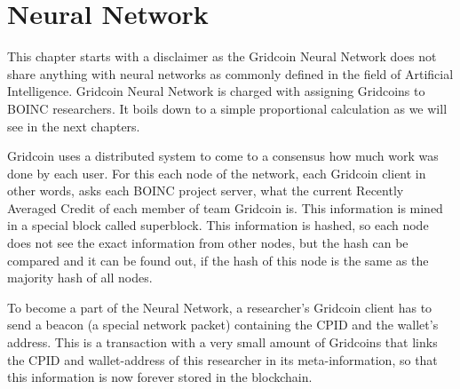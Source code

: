 \section{Neural Network}

This chapter starts with a disclaimer as the Gridcoin Neural Network does not share anything with neural networks as commonly defined in the field of Artificial Intelligence. Gridcoin Neural Network is charged with assigning Gridcoins to BOINC researchers. It boils down to a simple proportional calculation as we will see in the next chapters.

Gridcoin uses a distributed system to come to a consensus how much work was done by each user. For this each node of the network, each Gridcoin client in other words, asks each BOINC project server, what the current Recently Averaged Credit of each member of team Gridcoin is. This information is mined in a special block called superblock. This information is hashed, so each node does not see the exact information from other nodes, but the hash can be compared and it can be found out, if the hash of this node is the same as the majority hash of all nodes.

To become a part of the Neural Network, a researcher's Gridcoin client has to send a beacon (a special network packet) containing the CPID and the wallet's address. This is a transaction with a very small amount of Gridcoins that links  the CPID  and wallet-address of this researcher in its meta-information, so that this information is now forever stored in the blockchain.

